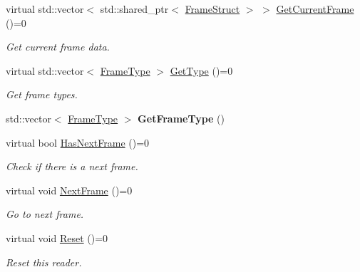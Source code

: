 \begin{DoxyCompactItemize}
virtual std\+::vector$<$ std\+::shared\+\_\+ptr$<$ \hyperlink{structmoetsi_1_1ssp_1_1FrameStruct}{Frame\+Struct} $>$ $>$ \hyperlink{classmoetsi_1_1ssp_1_1IReader_a357439182128e3911d77335c136035c0}{Get\+Current\+Frame} ()=0
\begin{DoxyCompactList}\small\item\em Get current frame data. \end{DoxyCompactList}\item 
virtual std\+::vector$<$ \hyperlink{namespacemoetsi_1_1ssp_a46efdfa2cd5a28ead465dcc8006b5a87}{Frame\+Type} $>$ \hyperlink{classmoetsi_1_1ssp_1_1IReader_a4116c1931fde7bd66133934ffdca1cce}{Get\+Type} ()=0
\begin{DoxyCompactList}\small\item\em Get frame types. \end{DoxyCompactList}\item 
\mbox{\label{classmoetsi_1_1ssp_1_1IReader_a304ee5995522eff86ae0102d4d7342f8}} 
std\+::vector$<$ \hyperlink{namespacemoetsi_1_1ssp_a46efdfa2cd5a28ead465dcc8006b5a87}{Frame\+Type} $>$ {\bfseries Get\+Frame\+Type} ()
\item 
virtual bool \hyperlink{classmoetsi_1_1ssp_1_1IReader_af9186ba41e136dc4ec3242b5dd55fa04}{Has\+Next\+Frame} ()=0
\begin{DoxyCompactList}\small\item\em Check if there is a next frame. \end{DoxyCompactList}\item 
\mbox{\label{classmoetsi_1_1ssp_1_1IReader_a49e82a786cca55248e27e7fac8f97a17}} 
virtual void \hyperlink{classmoetsi_1_1ssp_1_1IReader_a49e82a786cca55248e27e7fac8f97a17}{Next\+Frame} ()=0
\begin{DoxyCompactList}\small\item\em Go to next frame. \end{DoxyCompactList}\item 
\mbox{\label{classmoetsi_1_1ssp_1_1IReader_ad6e2ef78fc2466884aa877ecef54889d}} 
virtual void \hyperlink{classmoetsi_1_1ssp_1_1IReader_ad6e2ef78fc2466884aa877ecef54889d}{Reset} ()=0
\begin{DoxyCompactList}\small\item\em Reset this reader. \end{DoxyCompactList}\item 

\end{DoxyCompactItemize}
